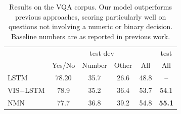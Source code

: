 \begin{table}
  \footnotesize
  \center
  \begin{tabular}{lccccc}
    \toprule
    & \multicolumn{4}{c}{test-dev} & test \\
    \cmidrule(lr){2-5} \cmidrule(lr){6-6}
    & Yes/No & Number & Other & All & All \\
    \midrule
    LSTM \cite{antol15iccv} & 78.20 & 35.7 & 26.6 & 48.8 & -- \\
    VIS+LSTM \cite{antol15iccv} & 78.9 & 35.2 & 36.4 & 53.7 & 54.1 \\
    NMN & 77.7 & 36.8 & 39.2 & 54.8 & \bf 55.1 \\
    \bottomrule
  \end{tabular}
  \caption{Results on the VQA corpus. Our model outperforms previous approaches,
    scoring particularly well on questions not involving a numeric or binary
    decision. Baseline numbers are as reported in previous work.}
    \label{tab:vqa-results}
\end{table}

